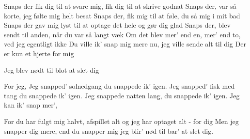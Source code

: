 \documentclass[a4paper,11pt]{article}
\begin{document}
\begin{song}
 Snaps der fik dig til at svare mig, fik dig til at skrive godnat
Snaps der, var så korte, jeg følte mig helt besat
Snaps der, fik mig til at føle, du så mig i mit bad
Snaps der gav mig lyst til at optage det hele og gør dig glad
Snaps der, blev sendt til anden, når du var så langt væk
Om det blev mer' end en, mer' end to, ved jeg egentligt ikke
Du ville ik’ snap mig mere nu, jeg ville sende alt til dig
Der er kun et hjerte for mig

 Jeg blev nødt til blot at slet dig

 For jeg, 
 Jeg snapped' solnedgang
du snappede ik' igen. 
Jeg snapped' fisk med tang
du snappede ik' igen. 
Jeg snappede natten lang, 
du snappede ik' igen.
Jeg kan ik' snap mer', 


 For du har fulgt mig halvt, afspillet alt 
og jeg har optaget alt - for dig
Men jeg snapper dig mere, end du snapper mig
jeg blir' nød til bar' at slet dig. 





\end{song}
\end{document}
